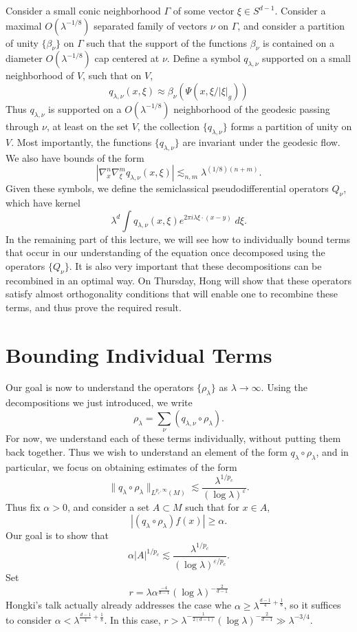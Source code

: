\documentclass{article}
\theoremstyle{plain}
\theoremstyle{remark}
\theoremstyle{definition}
\begin{document}
Consider a small conic neighborhood $\Gamma$ of some vector $\xi \in S^{d-1}$. Consider a maximal $O(\lambda^{-1/8})$ separated family of vectors $\nu$ on $\Gamma$, and consider a partition of unity $\{ \beta_\nu \}$ on $\Gamma$ such that the support of the functions $\beta_\nu$ is contained on a diameter $O(\lambda^{-1/8})$ cap centered at $\nu$. Define a symbol $q_{\lambda,\nu}$ supported on a small neighborhood of $V$, such that on $V$,
%
\[ q_{\lambda,\nu}(x,\xi) \approx \beta_\nu(\Psi(x, \xi / |\xi|_g ))   \]
%
Thus $q_{\lambda,\nu}$ is supported on a $O(\lambda^{-1/8})$ neighborhood of the geodesic passing through $\nu$, at least on the set $V$, the collection $\{ q_{\lambda,\nu} \}$ forms a partition of unity on $V$. Most importantly, the functions $\{ q_{\lambda,\nu} \}$ are invariant under the geodesic flow. We also have bounds of the form
%
\[ |\nabla_x^n \nabla_\xi^m q_{\lambda,\nu}(x,\xi)| \lesssim_{n,m} \lambda^{(1/8)(n + m)}. \]
%
Given these symbols, we define the semiclassical pseudodifferential operators $Q_\nu$, which have kernel
%
\[ \lambda^d \int q_{\lambda,\nu}(x,\xi) e^{2 \pi i \lambda \xi \cdot (x - y)}\; d\xi. \]
%
In the remaining part of this lecture, we will see how to individually bound terms that occur in our understanding of the equation once decomposed using the operators $\{ Q_\nu \}$. It is also very important that these decompositions can be recombined in an optimal way. On Thursday, Hong will show that these operators satisfy almost orthogonality conditions that will enable one to recombine these terms, and thus prove the required result.



\section{Bounding Individual Terms}

Our goal is now to understand the operators $\{ \rho_\lambda \}$ as $\lambda \to \infty$. Using the decompositions we just introduced, we write
%
\[ \rho_\lambda = \sum_\nu (q_{\lambda,\nu} \circ \rho_\lambda). \]
%
For now, we understand each of these terms individually, without putting them back together. Thus we wish to understand an element of the form $q_\lambda \circ \rho_\lambda$, and in particular, we focus on obtaining estimates of the form
%
\[ \| q_\lambda \circ \rho_\lambda \|_{L^{p_c,\infty}(M)} \lesssim \frac{\lambda^{1/p_c}}{(\log \lambda)^\varepsilon}. \]
%
Thus fix $\alpha > 0$, and consider a set $A \subset M$ such that for $x \in A$,
%
\[ |(q_\lambda \circ \rho_\lambda) f (x)| \geq \alpha. \]
%
Our goal is to show that
%
\[ \alpha |A|^{1/p_c} \lesssim \frac{\lambda^{1/p_c}}{(\log \lambda)^{\varepsilon / p_c}}. \]
%
Set
%
\[ r = \lambda \alpha^{\frac{-4}{d-1}} (\log \lambda)^{- \frac{2}{d-1}} \]
%
Hongki's talk actually already addresses the case whe $\alpha \geq \lambda^{\frac{d-1}{4} + \frac{1}{8}}$, so it suffices to consider $\alpha < \lambda^{\frac{d-1}{4} + \frac{1}{8}}$. In this case, $r > \lambda^{-\frac{1}{2(d-1)}} (\log \lambda)^{- \frac{2}{d-1}} \gg \lambda^{-3/4}$.
\end{document}

